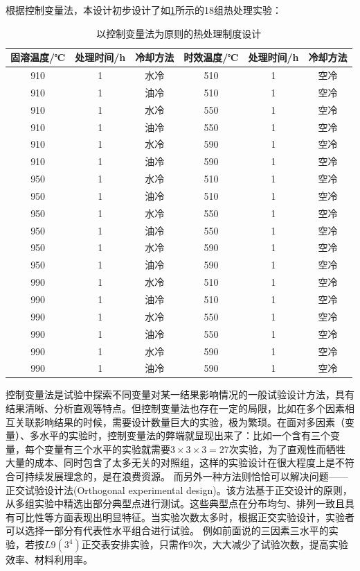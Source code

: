 根据控制变量法，本设计初步设计了如\ref{sec:first}所示的18组热处理实验：
\begin{table}[htbp]
	\centering
	\caption{以控制变量法为原则的热处理制度设计}
	\label{sec:first}
	\begin{tabular}{cccccc}
		\toprule
		固溶温度/℃ &处理时间/h & 冷却方法 & 时效温度/℃  &处理时间/h & 冷却方法 \\
		\midrule
		910 & 1 & $\mathrm{水冷}$ & 510 & 1 & $\mathrm{空冷}$\\
		910 & 1 & $\mathrm{油冷}$  & 510 & 1 & $\mathrm{空冷}$ \\
		910 & 1 & $\mathrm{水冷}$ & 550 & 1 & $\mathrm{空冷}$ \\
		910 & 1 & $\mathrm{油冷}$  & 550 & 1 & $\mathrm{空冷}$ \\
		910 & 1 & $\mathrm{水冷}$ & 590 & 1 & $\mathrm{空冷}$ \\
		910 & 1 & $\mathrm{油冷}$  & 590 & 1 & $\mathrm{空冷}$ \\
		\midrule
		950 & 1 & $\mathrm{水冷}$ & 510 & 1 & $\mathrm{空冷}$ \\
		950 & 1 & $\mathrm{油冷}$ & 510 & 1 & $\mathrm{空冷}$ \\
		950 & 1 & $\mathrm{水冷}$ & 550 & 1 & $\mathrm{空冷}$ \\
		950 & 1 & $\mathrm{油冷}$ & 550 & 1 & $\mathrm{空冷}$ \\
		950 & 1 & $\mathrm{水冷}$ & 590 & 1 & $\mathrm{空冷}$ \\
		950 & 1 & $\mathrm{油冷}$ & 590 & 1 & $\mathrm{空冷}$ \\
		\midrule
		990 & 1 & $\mathrm{水冷}$ & 510 & 1 & $\mathrm{空冷}$ \\
		990 & 1 & $\mathrm{油冷}$ & 510 & 1 & $\mathrm{空冷}$ \\
		990 & 1 & $\mathrm{水冷}$ & 550 & 1 & $\mathrm{空冷}$ \\
		990 & 1 & $\mathrm{油冷}$ & 550 & 1 & $\mathrm{空冷}$ \\
		990 & 1 & $\mathrm{水冷}$ & 590 & 1 & $\mathrm{空冷}$ \\
		990 & 1 & $\mathrm{油冷}$ & 590 & 1 & $\mathrm{空冷}$ \\
		\bottomrule
	\end{tabular}
\end{table}

控制变量法是试验中探索不同变量对某一结果影响情况的一般试验设计方法，具有结果清晰、分析直观等特点。但控制变量法也存在一定的局限，比如在多个因素相互关联影响结果的时候，需要设计数量巨大的实验，极为繁琐。在面对多因素（变量）、多水平的实验时，控制变量法的弊端就显现出来了：比如一个含有三个变量，每个变量有三个水平的实验就需要$ 3\times 3 \times 3=27$次实验，为了直观性而牺牲大量的成本、同时包含了太多无关的对照组，这样的实验设计在很大程度上是不符合可持续发展理念的，是在浪费资源。
而另外一种方法则恰恰可以解决问题——正交试验设计法(Orthogonal experimental design)。该方法基于正交设计的原则，从多组实验中精选出部分典型点进行测试。这些典型点在分布均匀、排列一致且具有可比性等方面表现出明显特征\cite{wangxueshen}。当实验次数太多时，根据正交实验设计，实验者可以选择一部分有代表性水平组合进行试验。 例如前面说的三因素三水平的实验，若按$ L9(3^4) $正交表安排实验，只需作9次，大大减少了试验次数，提高实验效率、材料利用率。



